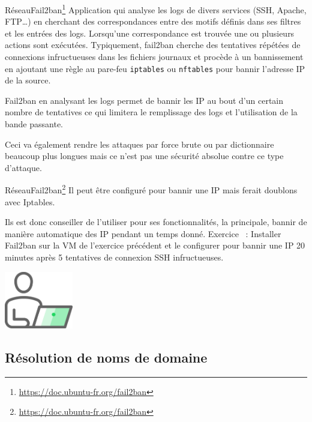 \documentclass{beamer}
\begin{document}
    \begin{frame}{Réseau}{Fail2ban\footnote{\url{https://doc.ubuntu-fr.org/fail2ban}}}
        Application qui analyse les logs de divers services (SSH, Apache, FTP…) en cherchant des correspondances entre des motifs définis dans ses filtres et les entrées des logs.
        Lorsqu'une correspondance est trouvée une ou plusieurs actions sont exécutées.
        Typiquement, fail2ban cherche des tentatives répétées de connexions infructueuses dans les fichiers journaux et procède à un bannissement en ajoutant une règle au pare-feu \lstinline{iptables} ou \lstinline{nftables} pour bannir l'adresse IP de la source.
        \begin{dangercolorbox}
            Fail2ban en analysant les logs permet de bannir les IP au bout d'un certain nombre de tentatives ce qui limitera le remplissage des logs et l'utilisation de la bande passante.

            Ceci va également rendre les attaques par force brute ou par dictionnaire beaucoup plus longues mais ce n'est pas une sécurité absolue contre ce type d'attaque.
        \end{dangercolorbox}
    \end{frame}

    \begin{frame}{Réseau}{Fail2ban\footnote{\url{https://doc.ubuntu-fr.org/fail2ban}}}
        Il peut être configuré pour bannir une IP mais ferait doublons avec Iptables.

        Ils est donc conseiller de l'utiliser pour ses fonctionnalités, la principale, bannir de manière automatique des IP pendant un temps donné.
        \bigbreak
        Exercice \execcounterdispinc{}~:
        Installer Fail2ban sur la VM de l'exercice précédent et le configurer pour bannir une IP 20 minutes après 5 tentatives de connexion SSH infructueuses.
        \begin{center}
            \includegraphics[width=3cm]{image/guy-in-front-of-desktop}
        \end{center}
    \end{frame}

    \subsection{Résolution de noms de domaine}\label{subsec:domaine-name-resolution}
\end{document}
